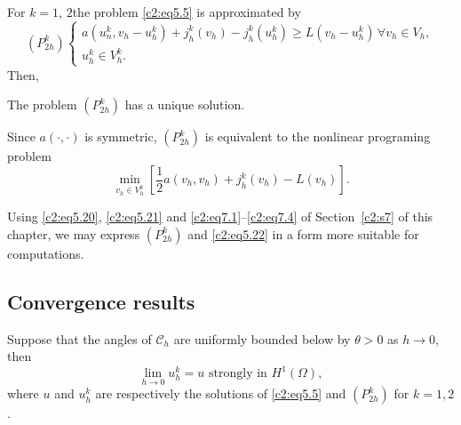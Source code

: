 For $k=1$, $2$\pageoriginale  the problem \eqref{c2:eq5.5} is approximated by 
\begin{equation*}
(P^k_{2h})
\begin{cases}
a (u^k_n, v_h - u^k_h) + j^k_h (v_h)- j^k_h (u^k_h) \geq L (v_h -
u^k_h)\, \forall  v_h \in V_h,\\ 
u^k_h \in V^k_h.
\end{cases}
\end{equation*}
Then,
\begin{proposition}\label{c2:prop5.1} %
The problem $(P^k_{2h})$ has a unique solution.
\end{proposition}

\begin{remark}\label{c2:rem5.6}%
Since $a(\cdot , \cdot)$ is symmetric, $(P^k_{2h})$ is equivalent to
the  nonlinear programing problem  
\begin{equation}
\min_{v_h \in V^k_h} \left[\frac{1}{2} a (v_h, v_h) +  j^k_h (v_h) - L
  (v_h)\right]. \tag{5.22}\label{c2:eq5.22} 
\end{equation}
\end{remark}

\begin{remark}\label{c2:rem5.7}%
Using \eqref{c2:eq5.20}, \eqref{c2:eq5.21} and
\eqref{c2:eq7.1}--\eqref{c2:eq7.4} 
of Section~\ref{c2:s7} of this chapter, we may express $(P^k_{2h})$
and \eqref{c2:eq5.22} in a form more suitable for computations. 
\end{remark}

\subsection{Convergence results}\label{c2:ss5.5} %

\begin{theorem}\label{c2:thm5.4}%
Suppose that the angles of $\mathscr{C}_h$ are uniformly bounded below
by $\theta > 0$ as $ h \to 0$, then  
\begin{equation} 
\lim_{h \to 0} u^k_h = u \text{ strongly in } H^1 (\Omega),
\tag{5.23}\label{c2:eq5.23}
\end{equation}
where $u$ and $u^k_h$ are respectively the solutions of \eqref{c2:eq5.5} and
$(P^k_{2h})$ for $k=1,2$. 
\end{theorem}

